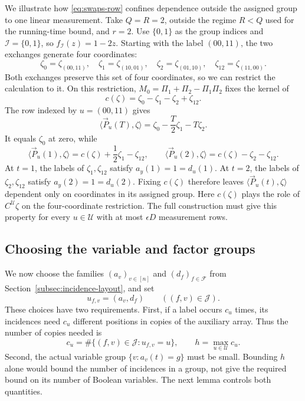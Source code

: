 \begin{remark}
We illustrate how \eqref{eq:swaps-row} confines dependence outside the
assigned group to one linear measurement. Take $Q=R=2$, outside the
regime $R<Q$ used for the running-time bound, and $r=2$. Use
$\{0,1\}$ as the group indices and $\mathcal I=\{0,1\}$, so
$f_{\mathcal I}(z)=1-2z$. Starting with the label $(00,11)$, the
two exchanges generate four coordinates:
\[
 \zeta_0=\zeta_{(00,11)},\quad \zeta_1=\zeta_{(10,01)},\quad
 \zeta_2=\zeta_{(01,10)},\quad \zeta_{12}=\zeta_{(11,00)}.
\]
Both exchanges preserve this set of four coordinates, so we can
restrict the calculation to it. On this restriction,
$M_0=\Pi_1+\Pi_2-\Pi_1\Pi_2$ fixes the kernel of
\[
 c(\zeta)=\zeta_0-\zeta_1-\zeta_2+\zeta_{12}.
\]
The row indexed by $u=(00,11)$ gives
\[
 \langle \vec{P}_u(T), \zeta\rangle=\zeta_0-\frac T2\zeta_1-T\zeta_2.
\]
It equals $\zeta_0$ at zero, while
\[
 \langle \vec{P}_u(1), \zeta\rangle=c(\zeta)+\frac12\zeta_1-\zeta_{12},\qquad
 \langle \vec{P}_u(2), \zeta\rangle=c(\zeta)-\zeta_2-\zeta_{12}.
\]
At $t=1$, the labels of $\zeta_1,\zeta_{12}$ satisfy
$a_y(1)=1=d_u(1)$. At $t=2$, the labels of
$\zeta_2,\zeta_{12}$ satisfy $a_y(2)=1=d_u(2)$.
Fixing $c(\zeta)$ therefore leaves $\langle \vec{P}_u(t), \zeta\rangle$ dependent only on
coordinates in its assigned group. Here $c(\zeta)$ plays the role
of $C^{\mathcal U}\zeta$ on the four-coordinate restriction. The
full construction must give this property for every $u\in\mathcal U$
with at most $\epsilon D$ measurement rows.
\end{remark}

\subsection{Choosing the variable and factor groups}\label{subsec:choosing-labels}
We now choose the families $(a_v)_{v\in[n]}$ and
$(d_f)_{f\in\mathcal F}$ from
Section~\ref{subsec:incidence-layout}, and set
\[
 u_{f,v}=(a_v,d_f)\qquad((f,v)\in\mathcal J).
\]
These choices have two requirements. First, if a label occurs $c_u$
times, its incidences need $c_u$ different positions in copies of the
auxiliary array. Thus the number of copies needed is
\[
 c_u=\#\{(f,v)\in\mathcal J:u_{f,v}=u\},\qquad
 h=\max_{u\in\mathcal U}c_u.
\]
Second, the actual variable group $\{v:a_v(t)=g\}$ must be small.
Bounding $h$ alone would bound the number of incidences in a group,
not give the required bound on its number of Boolean variables.
The next lemma controls both quantities.

